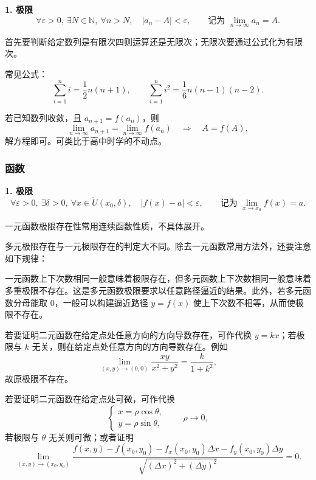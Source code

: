 \documentclass[UTF8,fontset=fandol,zihao=5]{ctexart}
\newcommand{\N}{\mathbb{N}}
\begin{document}
\textbf{1. 极限}
\[
\forall\varepsilon>0,\ \exists N\in\N,\ \forall n>N,
\quad |a_n-A|<\varepsilon,
\qquad \text{记为 }\lim_{n\to\infty}a_n=A.
\]

\begin{method}[判断数列极限存在与否]
首先要判断给定数列是有限次四则运算还是无限次；无限次要通过公式化为有限次。

常见公式：
\[
\sum_{i=1}^{n}i=\frac{1}{2}n(n+1),
\qquad
\sum_{i=1}^{n}i^2=\frac{1}{6}n(n-1)(n-2).
\]
\end{method}

\begin{method}[由递推公式求数列极限值]
若已知数列收敛，且 $a_{n+1}=f(a_n)$，则
\[
\lim_{n\to\infty}a_{n+1}=\lim_{n\to\infty}f(a_n)
\quad\Longrightarrow\quad A=f(A),
\]
解方程即可。可类比于高中时学的不动点。
\end{method}

\subsubsection{函数}

\textbf{1. 极限}
\[
\forall\varepsilon>0,\ \exists\delta>0,\
\forall x\in\mathring{U}(x_0,\delta),
\quad |f(x)-a|<\varepsilon,
\qquad \text{记为 }\lim_{x\to x_0}f(x)=a.
\]

\begin{method}[判断函数在给定点处极限存在与否]
一元函数极限存在性常用连续函数性质，不具体展开。

多元极限存在与一元极限存在的判定大不同。除去一元函数常用方法外，还要注意如下规律：

一元函数上下次数相同一般意味着极限存在，但多元函数上下次数相同一般意味着多重极限不存在。这是多元函数极限要求以任意路径逼近的结果。此外，若多元函数分母能取 $0$，一般可以构建逼近路径 $y=f(x)$ 使上下次数不相等，从而使极限不存在。

若要证明二元函数在给定点处任意方向的方向导数存在，可作代换 $y=kx$；若极限与 $k$ 无关，则在给定点处任意方向的方向导数存在。例如
\[
\lim_{(x,y)\to(0,0)}\frac{xy}{x^2+y^2}
=\frac{k}{1+k^2},
\]
故原极限不存在。

若要证明二元函数在给定点处可微，可作代换
\[
\begin{cases}
x=\rho\cos\theta,\\
y=\rho\sin\theta,
\end{cases}
\qquad \rho\to0,
\]
若极限与 $\theta$ 无关则可微；或者证明
\[
\lim_{(x,y)\to(x_0,y_0)}
\frac{f(x,y)-f(x_0,y_0)-f_x(x_0,y_0)\Delta x-f_y(x_0,y_0)\Delta y}
{\sqrt{(\Delta x)^2+(\Delta y)^2}}=0.
\]
\end{method}
\end{document}
